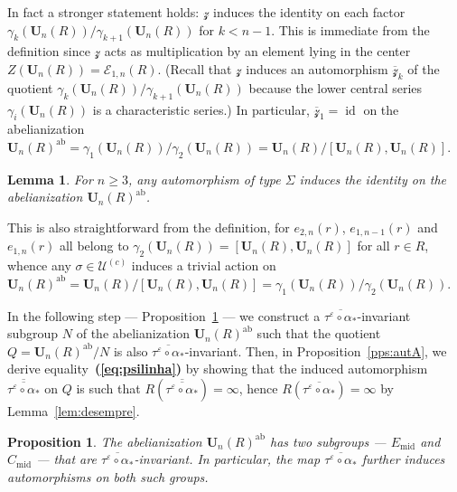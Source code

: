 \documentclass[a4paper,11pt]{amsart}
\makeatletter
\numberwithin{equation}{section}
\theoremstyle{plain}
\newtheorem{lem}[thm]{Lemma}
\newtheorem{pps}[thm]{Proposition}
\theoremstyle{definition}
\renewenvironment{proof}[1][\proofname] {\par\pushQED{\qed}\normalfont\topsep6\p@\@plus6\p@\relax\trivlist\item[\hskip\labelsep\bfseries#1\@addpunct{.}]\ignorespaces}{\popQED\endtrivlist\@endpefalse}
\newcommand{\mbU}{\mathbf{U}} %
\newcommand{\veps}{\varepsilon} %
\newcommand{\barra}[1]{\overline{#1}}
\newcommand{\mc}{\mathcal}
\newcommand{\bref}[1]{{\bf(\ref{#1})}} %
\DeclareMathOperator{\id}{id}
\makeatother
\begin{document}
\begin{proof}
In fact a stronger statement holds: $\mc{z}$ induces the identity on each factor $\gamma_k(\mbU_n(R)) / \gamma_{k+1}(\mbU_n(R))$ for $k < n-1$. This is immediate from the definition since $\mc{z}$ acts as multiplication by an element lying in the center $Z(\mbU_n(R)) = \mc{E}_{1,n}(R)$. (Recall that $\mc{z}$ induces an automorphism $\barra{\mc{z}}_k$ of the quotient $\gamma_k(\mbU_n(R)) / \gamma_{k+1}(\mbU_n(R))$ because the lower central series $\gamma_i(\mbU_n(R))$ is a characteristic series.) In particular, $\barra{\mc{z}}_1 = \id$ on the abelianization $\mbU_n(R)^{\mathrm{ab}} = \gamma_1(\mbU_n(R)) / \gamma_{2}(\mbU_n(R)) = \mbU_n(R) / [\mbU_n(R),\mbU_n(R)]$.
\end{proof}

\begin{lem} \label{obs:sigmaautomorphisms}
For $n \geq 3$, any automorphism of type $\Sigma$ induces the identity on the abelianization $\mbU_n(R)^{\mathrm{ab}}$.
\end{lem}

\begin{proof}
This is also straightforward from the definition, for $e_{2,n}(r)$, $e_{1,n-1}(r)$ and $e_{1,n}(r)$ all belong to $\gamma_2(\mbU_n(R)) = [\mbU_n(R),\mbU_n(R)]$ for all $r \in R$, whence any $\sigma \in \mc{U}^{(c)}$ induces a trivial action on $\mbU_n(R)^{\mathrm{ab}} = \mbU_n(R) / [\mbU_n(R), \mbU_n(R)] = \gamma_1(\mbU_n(R)) / \gamma_2(\mbU_n(R))$. 
\end{proof}

In the following step --- Proposition~\ref{obs:flip} --- we construct a $\barra{\tau^\veps \circ \alpha_\ast}$-invariant subgroup $N$ of the abelianization $\mbU_n(R)^{\mathrm{ab}}$ such that the quotient $Q=\mbU_n(R)^{\mathrm{ab}}/N$ is also $\barra{\tau^\veps \circ \alpha_\ast}$-invariant. Then, in Proposition~\ref{pps:autA}, we derive equality~\bref{eq:psilinha} by showing that the induced automorphism $\barra{\barra{\tau^\veps \circ \alpha_\ast}}$ on $Q$ is such that $R(\barra{\barra{\tau^\veps \circ \alpha_\ast}})=\infty$, hence $R(\barra{\tau^\veps \circ \alpha_\ast}) 
=\infty$ by Lemma~\ref{lem:desempre}.


\begin{pps}\label{obs:flip} The abelianization $\mbU_n(R)^{\mathrm{ab}}$ has two subgroups --- $E_{\mathrm{mid}}$ and $C_{\mathrm{mid}}$ --- that are 
{$\barra{\tau^\veps \circ \alpha_\ast}$-invariant}. In particular, the map 
{$\barra{\tau^\veps \circ \alpha_\ast}$} further induces automorphisms on both such groups.
\end{pps}
\end{document}
